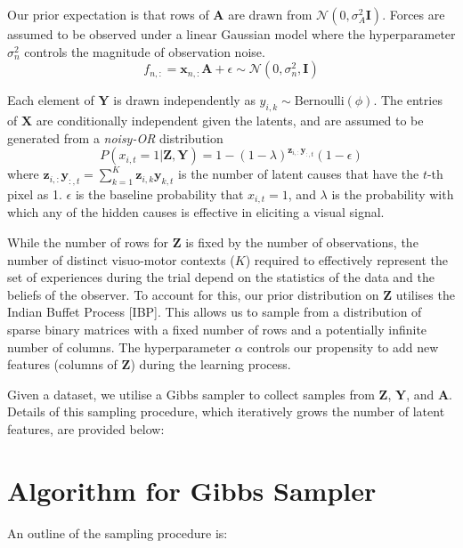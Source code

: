 \documentclass[]{article}
\begin{document}
Our prior expectation is that rows of $\mathbf{A}$ are drawn from $\mathcal{N}(0, \sigma^2_A \mathbf{I})$. Forces are assumed to be observed under a linear Gaussian model where the hyperparameter $\sigma^2_n$ controls the magnitude of observation noise. 
\begin{equation*}
	f_{n,:} = \mathbf{x}_{n,:}\mathbf{A} + \epsilon \sim \mathcal{N}(0, \sigma^2_n, \mathbf{I})
\end{equation*}

Each element of $\mathbf{Y}$ is drawn independently as $y_{i,k} \sim \text{Bernoulli}(\phi)$. The entries of $\mathbf{X}$ are conditionally independent given the latents, and are assumed to be generated from a \textit{noisy-OR} distribution
\begin{equation}
	P(x_{i,t} = 1 | \mathbf{Z}, \mathbf{Y}) = 1 - (1-\lambda)^{\mathbf{z}_{i,:}\mathbf{y}_{:,t}}(1-\epsilon)
\end{equation}
where $\mathbf{z}_{i,:}\mathbf{y}_{:,t} = \sum_{k=1}^{K} \mathbf{z}_{i,k}\mathbf{y}_{k,t}$ is the number of latent causes that have the $t$-th pixel as 1. $\epsilon$ is the baseline probability that $x_{i,t} = 1$, and $\lambda$ is the probability with which any of the hidden causes is effective in eliciting a visual signal. 

While the number of rows for $\mathbf{Z}$ is fixed by the number of observations, the number of distinct visuo-motor contexts ($K$) required to effectively represent the set of experiences during the trial depend on the statistics of the data and the beliefs of the observer. To account for this, our prior distribution on $\mathbf{Z}$ utilises the Indian Buffet Process [IBP]. This allows us to sample from a distribution of sparse binary matrices with a fixed number of rows and a potentially infinite number of columns. The hyperparameter $\alpha$ controls our propensity to add new features (columns of $\mathbf{Z}$) during the learning process.

Given a dataset, we utilise a Gibbs sampler to collect samples from $\mathbf{Z}$, $\mathbf{Y}$, and $\mathbf{A}$. Details of this sampling procedure, which iteratively grows the number of latent features, are provided below:

\newpage
\section{Algorithm for Gibbs Sampler}
An outline of the sampling procedure is:
\end{document}
